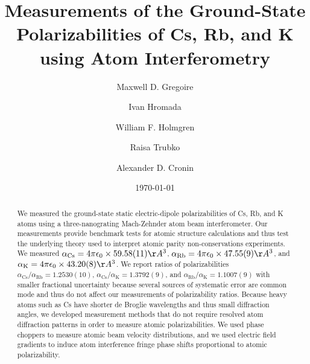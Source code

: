 \documentclass[twocolumn,prl,showpacs,superscriptaddress]{revtex4-1}   %
\newcommand{\ak}{\alpha_{\textrm{K}}}
\newcommand{\arb}{\alpha_{\textrm{Rb}}}
\newcommand{\acs}{\alpha_{\textrm{Cs}}}
\newcommand{\polKSysOnly}{43.20(8)}
\newcommand{\polRbSysOnly}{47.55(9)}
\newcommand{\polCsSysOnly}{59.58(11)}
\newcommand{\ratRbK}{1.1007(9)}
\newcommand{\ratCsK}{1.3792(9)}
\newcommand{\ratCsRb}{1.2530(10)}
\begin{document}
\title{Measurements of the Ground-State Polarizabilities of Cs, Rb, and K using Atom Interferometry}

\author{Maxwell D. Gregoire}
\author{Ivan Hromada}
\author{William F. Holmgren}
\author{Raisa Trubko}
\author{Alexander D. Cronin}

\date{\today}





\begin{abstract}
We measured the ground-state static electric-dipole polarizabilities of Cs, Rb, and K atoms using a three-nanograting Mach-Zehnder atom beam interferometer.  Our measurements provide benchmark tests for atomic structure calculations and thus test the underlying theory used to interpret atomic parity non-conservations experiments.  We measured $\acs = 4\pi\epsilon_0 \times \polCsSysOnly \AA^3$, $\arb = 4\pi\epsilon_0 \times \polRbSysOnly \AA^3$, and $\ak = 4\pi\epsilon_0 \times \polKSysOnly \AA^3$.   We report ratios of polarizabilities $\acs/\arb = \ratCsRb$, $\acs/\ak = \ratCsK$, and $\arb/\ak = \ratRbK$ with smaller fractional uncertainty because several sources of systematic error are common mode and thus do not affect our measurements of polarizability ratios.  Because heavy atoms such as Cs have shorter de Broglie wavelengths and thus small diffraction angles, we developed measurement methods that do not require resolved atom diffraction patterns in order to measure atomic polarizabilities.  We used phase choppers to measure atomic beam velocity distributions, and we used electric field gradients to induce atom interference fringe phase shifts proportional to atomic polarizability.
\end{abstract}
\end{document}
